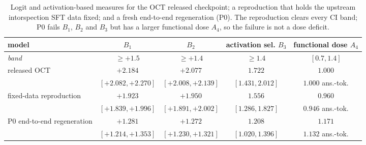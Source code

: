 \begin{table}[t]
\centering
\small
\begin{tabular}{lcccc}
\toprule
model & $B_1$ & $B_2$ & activation sel. $B_3$ & functional dose $A_4$ \\
\midrule
\emph{band} & $\geq +1.5$ & $\geq +1.4$ & $\geq 1.4$ & $[0.7, 1.4]$ \\
\midrule
released OCT & $+2.184$ & $+2.077$ & $1.722$ & $1.000$ \\
 & {\scriptsize $[+2.082, +2.270]$} & {\scriptsize $[+2.008, +2.139]$} & {\scriptsize $[1.431, 2.012]$} & {\scriptsize $1.000$ ans.-tok.} \\
\addlinespace
fixed-data reproduction & $+1.923$ & $+1.950$ & $1.556$ & $0.960$ \\
 & {\scriptsize $[+1.839, +1.996]$} & {\scriptsize $[+1.891, +2.002]$} & {\scriptsize $[1.286, 1.827]$} & {\scriptsize $0.946$ ans.-tok.} \\
\addlinespace
P0 end-to-end regeneration & $+1.281$ & $+1.272$ & $1.208$ & $1.171$ \\
 & {\scriptsize $[+1.214, +1.353]$} & {\scriptsize $[+1.230, +1.321]$} & {\scriptsize $[1.020, 1.396]$} & {\scriptsize $1.132$ ans.-tok.} \\
\bottomrule
\end{tabular}
\caption{Logit and activation-based measures for the OCT released checkpoint; a reproduction that holds the upstream intorspection SFT data fixed; and a fresh end-to-end regeneration (P0). The reproduction clears every CI band; P0 fails $B_1$, $B_2$ and $B_3$ but has a larger functional dose $A_4$, so the failure is not a dose deficit.}
\label{tab:paraphrase-headline}
\end{table}
